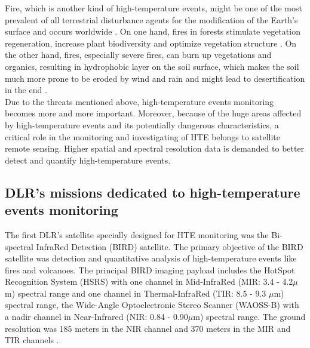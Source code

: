 \noindent Fire, which is another kind of high-temperature events, might be one of the most prevalent of all terrestrial disturbance agents for the modification of the Earth's surface and occurs worldwide \parencite{Reference6}. On one hand, fires in forests stimulate vegetation regeneration, increase plant biodiversity and optimize vegetation structure \parencite{Reference7}. On the other hand, fires, especially severe fires, can burn up vegetations and organics, resulting in hydrophobic layer on the soil surface, which makes the soil much more prone to be eroded by wind and rain and might lead to desertification in the end \parencite{Reference8}.\\

\noindent Due to the threats mentioned above, high-temperature events monitoring becomes more and more important. Moreover, because of the huge areas affected by high-temperature events and its potentially dangerous characteristics, a critical role in the monitoring and investigating of HTE belongs to satellite remote sensing. Higher spatial and spectral resolution data is demanded to better detect and quantify high-temperature events.\\


\subsection{DLR's missions dedicated to high-temperature events monitoring}

The first DLR's satellite specially designed for HTE monitoring was the Bi-spectral InfraRed Detection (BIRD) satellite. The primary objective of the BIRD satellite was detection and quantitative analysis of high-temperature events like fires and volcanoes. The principal BIRD imaging payload includes the HotSpot Recognition System (HSRS) with one channel in Mid-InfraRed (MIR: 3.4 - 4.2$\mu$m) spectral range and one channel in Thermal-InfraRed (TIR: 8.5 - 9.3 $\mu$m) spectral range, the Wide-Angle Optoelectronic Stereo Scanner (WAOSS-B) with a nadir channel in Near-Infrared (NIR: 0.84 - 0.90$\mu$m) spectral range. The ground resolution was 185 meters in the NIR channel and 370 meters in the MIR and TIR channels \parencite{Reference9}.\\


